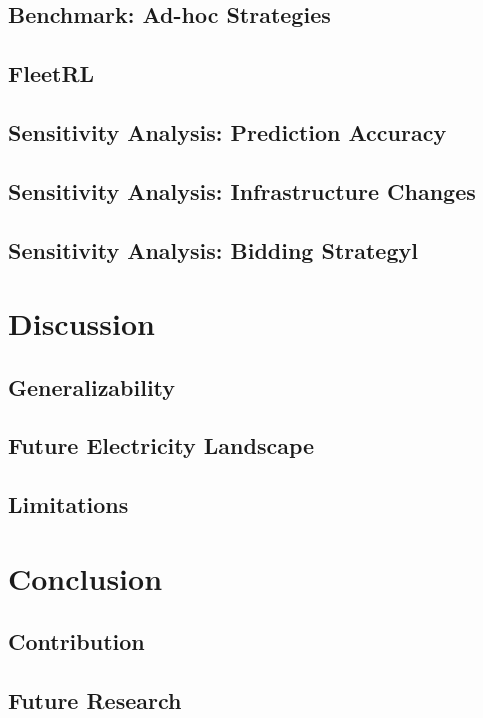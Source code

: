 \documentclass[a4paper, 12pt]{article}
\begin{document}
\subsection{Benchmark: Ad-hoc Strategies}
\label{sec:orgec2bb4a}
\subsection{FleetRL}
\label{sec:orgbab61b0}
\subsection{Sensitivity Analysis: Prediction Accuracy}
\label{sec:org7308dfe}
\subsection{Sensitivity Analysis: Infrastructure Changes}
\label{sec:org46f82ef}
\subsection{Sensitivity Analysis: Bidding Strategyl}
\label{sec:org6361300}
\section{Discussion}
\label{sec:orgb586cf4}
\subsection{Generalizability}
\label{sec:org0c93462}
\subsection{Future Electricity Landscape}
\label{sec:orga8291bf}
\subsection{Limitations}
\label{sec:org4df8724}
\section{Conclusion}
\label{sec:org84bd6bc}
\subsection{Contribution}
\label{sec:org0642f5c}
\subsection{Future Research}
\label{sec:org78ec336}


\clearpage


\end{document}
